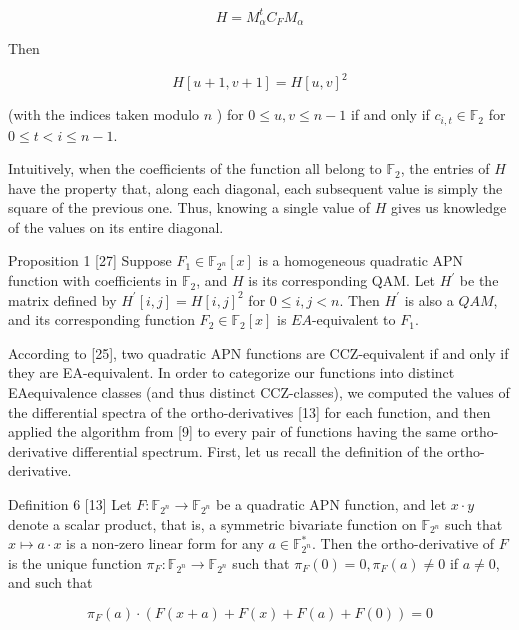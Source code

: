 \documentclass[10pt]{article}
\begin{document}
$$
H=M_{\alpha}^{t} C_{F} M_{\alpha}
$$

Then


\begin{equation*}
H[u+1, v+1]=H[u, v]^{2} \tag{1}
\end{equation*}


(with the indices taken modulo $n$ ) for $0 \leq u, v \leq n-1$ if and only if $c_{i, t} \in \mathbb{F}_{2}$ for $0 \leq t<i \leq n-1$.

Intuitively, when the coefficients of the function all belong to $\mathbb{F}_{2}$, the entries of $H$ have the property that, along each diagonal, each subsequent value is simply the square of the previous one. Thus, knowing a single value of $H$ gives us knowledge of the values on its entire diagonal.

Proposition 1 [27] Suppose $F_{1} \in \mathbb{F}_{2^{n}}[x]$ is a homogeneous quadratic APN function with coefficients in $\mathbb{F}_{2}$, and $H$ is its corresponding QAM. Let $H^{\prime}$ be the matrix defined by $H^{\prime}[i, j]=H[i, j]^{2}$ for $0 \leq i, j<n$. Then $H^{\prime}$ is also a $Q A M$, and its corresponding function $F_{2} \in \mathbb{F}_{2}[x]$ is $E A$-equivalent to $F_{1}$.

According to [25], two quadratic APN functions are CCZ-equivalent if and only if they are EA-equivalent. In order to categorize our functions into distinct EAequivalence classes (and thus distinct CCZ-classes), we computed the values of the differential spectra of the ortho-derivatives [13] for each function, and then applied the algorithm from [9] to every pair of functions having the same ortho-derivative differential spectrum. First, let us recall the definition of the ortho-derivative.

Definition 6 [13] Let $F: \mathbb{F}_{2^{n}} \rightarrow \mathbb{F}_{2^{n}}$ be a quadratic APN function, and let $x \cdot y$ denote a scalar product, that is, a symmetric bivariate function on $\mathbb{F}_{2^{n}}$ such that $x \mapsto a \cdot x$ is a non-zero linear form for any $a \in \mathbb{F}_{2^{n}}^{*}$. Then the ortho-derivative of $F$ is the unique function $\pi_{F}: \mathbb{F}_{2^{n}} \rightarrow \mathbb{F}_{2^{n}}$ such that $\pi_{F}(0)=0, \pi_{F}(a) \neq 0$ if $a \neq 0$, and such that


\begin{equation*}
\pi_{F}(a) \cdot(F(x+a)+F(x)+F(a)+F(0))=0 \tag{2}
\end{equation*}
\end{document}
